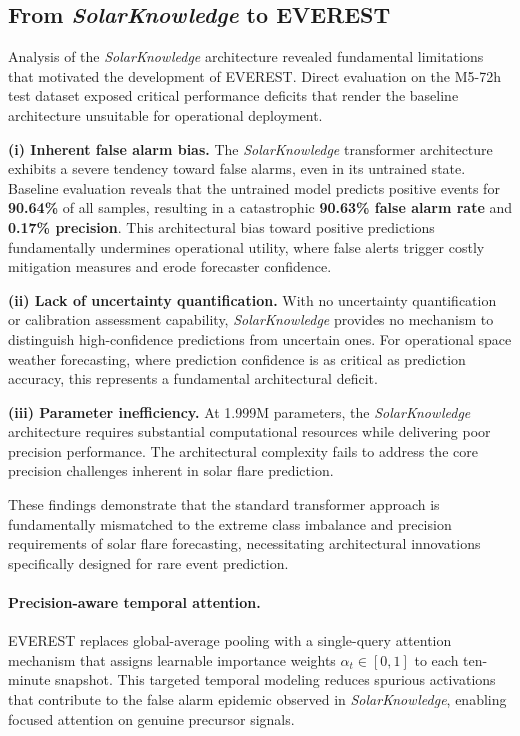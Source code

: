 \subsection{From \textit{SolarKnowledge} to \textsc{EVEREST}}
\label{sec:sk2ev-transition}
Analysis of the \textit{SolarKnowledge} architecture revealed fundamental limitations that motivated the development of \textsc{EVEREST}. Direct evaluation on the M5-72h test dataset exposed critical performance deficits that render the baseline architecture unsuitable for operational deployment.

\textbf{(i) Inherent false alarm bias.}
The \textit{SolarKnowledge} transformer architecture exhibits a severe tendency toward false alarms, even in its untrained state. Baseline evaluation reveals that the untrained model predicts positive events for \textbf{90.64\%} of all samples, resulting in a catastrophic \textbf{90.63\% false alarm rate} and \textbf{0.17\% precision}. This architectural bias toward positive predictions fundamentally undermines operational utility, where false alerts trigger costly mitigation measures and erode forecaster confidence.

\textbf{(ii) Lack of uncertainty quantification.}
With no uncertainty quantification or calibration assessment capability, \textit{SolarKnowledge} provides no mechanism to distinguish high-confidence predictions from uncertain ones. For operational space weather forecasting, where prediction confidence is as critical as prediction accuracy, this represents a fundamental architectural deficit.

\textbf{(iii) Parameter inefficiency.}
At 1.999M parameters, the \textit{SolarKnowledge} architecture requires substantial computational resources while delivering poor precision performance. The architectural complexity fails to address the core precision challenges inherent in solar flare prediction.

These findings demonstrate that the standard transformer approach is fundamentally mismatched to the extreme class imbalance and precision requirements of solar flare forecasting, necessitating architectural innovations specifically designed for rare event prediction.

\paragraph{Precision-aware temporal attention.}
\textsc{EVEREST} replaces global-average pooling with a single-query attention mechanism that assigns learnable importance weights $\alpha_t\!\in\![0,1]$ to each ten-minute snapshot. This targeted temporal modeling reduces spurious activations that contribute to the false alarm epidemic observed in \textit{SolarKnowledge}, enabling focused attention on genuine precursor signals.

